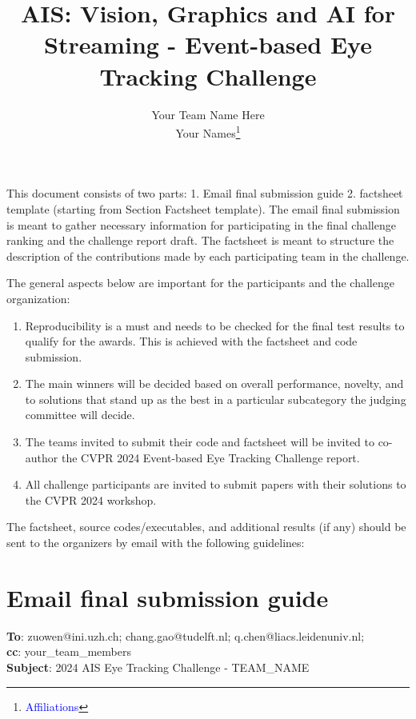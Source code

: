 \documentclass{article}
\title{AIS: Vision, Graphics and AI for Streaming - Event-based Eye Tracking Challenge}
\author{Your Team Name Here\\
Your Names\thanks{\textcolor{blue}{Affiliations}}\\
}
\begin{document}
\maketitle

This document consists of two parts: 1. Email final submission guide 2. factsheet template (starting from Section Factsheet template). The email final submission is meant to gather necessary information for participating in the final challenge ranking and the challenge report draft. The factsheet is meant to structure the description of the contributions made by each participating team in the challenge.

The general aspects below are important for the participants and the challenge organization:
\begin{enumerate}
    \item Reproducibility is a must and needs to be checked for the final test results to qualify for the awards. This is achieved with the factsheet and code submission.
    
    \item The main winners will be decided based on overall performance, novelty, and to solutions that stand up as the best in a particular subcategory the judging committee will decide.
    
    \item The teams invited to submit their code and factsheet will be invited to co-author the CVPR 2024 Event-based Eye Tracking Challenge report. 
    
    \item All challenge participants are invited to submit papers with their solutions to the CVPR 2024 workshop.

\end{enumerate}

The factsheet, source codes/executables, and additional results (if any) should be sent to the organizers by email with the following guidelines:




\section*{Email final submission guide}

\textbf{To}: zuowen@ini.uzh.ch; chang.gao@tudelft.nl; q.chen@liacs.leidenuniv.nl; \\
\textbf{cc}: your\_team\_members\\
\textbf{Subject}: 2024 AIS Eye Tracking Challenge - TEAM\_NAME\\
\end{document}
